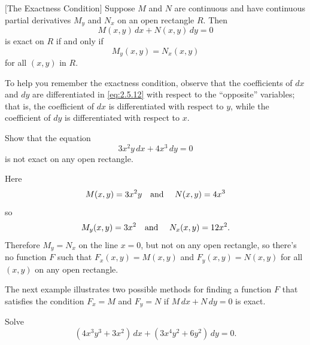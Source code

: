 \begin{theorem}
  \color{blue}
  $[$The Exactness Condition$]$\label{thmtype:2.5.2} \space Suppose $M$ and $N$ are continuous and
  have continuous partial derivatives $M_{y}$ and $N_{x}$ on an open rectangle $R$. Then
  \[
    M(x,y)\,dx+N(x,y)\,dy=0
  \]
  is exact on $R$ if and only if
  \begin{equation}
    \label{eq:2.5.12}M_{y}(x,y)=N_{x}(x,y)
  \end{equation}
  for all $(x,y)$ in $R$.
\end{theorem}

To help you remember the exactness condition, observe that the coefficients of $dx$ and $dy$ are
differentiated in \eqref{eq:2.5.12} with respect to the ``opposite'' variables; that is, the
coefficient of $dx$ is differentiated with respect to $y$, while the coefficient of $dy$ is
differentiated with respect to $x$.

\begin{example}
  \label{example:2.5.2} \rm Show that the equation
  \[
    3x^{2}y\,dx+4x^{3}\,dy=0
  \]
  is not exact on any open rectangle.
\end{example}

\begin{examplesolution}
\solution Here
\[
  M(x,y)=3x^{2}y\mbox{\quad and \quad}N(x,y)=4x^{3}
\]
so
\[
  M_{y}(x,y)=3x^{2}\mbox{\quad and \quad}N_{x}(x,y)=12x^{2}.
\]
Therefore $M_{y}=N_{x}$ on the line $x=0$, but not on any open rectangle, so there's no function $F$
such that $F_{x}(x,y)=M(x,y)$ and $F_{y}(x,y)=N(x,y)$ for all $(x,y)$ on any open rectangle. \bbox
\end{examplesolution}

The next example illustrates two possible methods for finding a function $F$ that satisfies the
condition $F_{x}=M$ and $F_{y}=N$ if $M\,dx+N\,dy=0$ is exact.

\begin{example}
  \label{example:2.5.3} \rm Solve
  \begin{equation}
    \label{eq:2.5.13}(4x^{3}y^{3}+3x^{2})\,dx+(3x^{4}y^{2}+6y^{2})\,dy=0.
  \end{equation}
\end{example}


